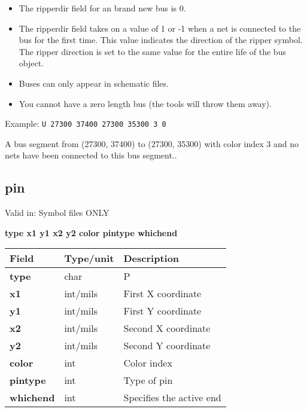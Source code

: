 \documentclass{article}
\begin{document}
\begin{itemize}
\item The ripperdir field for an brand new bus is 0.
\item The ripperdir field takes on a value of 1 or -1 when a net is connected
      to the bus for the first time.  This value indicates the direction of
      the ripper symbol.  The ripper direction is set to the same value for the
      entire life of the bus object. 
\item Buses can only appear in schematic files.
\item You cannot have a zero length bus (the tools will throw them away).
\end{itemize}

Example:\newline
{\tt U 27300 37400 27300 35300 3 0}

A bus segment from (27300, 37400) to (27300, 35300) with color index 3 and
no nets have been connected to this bus segment..


\subsection{pin}

Valid in: Symbol files ONLY

{\bf type x1 y1 x2 y2 color pintype whichend}

\begin{table}[h]
\begin{tabular}{|l|l|l|} \hline
Field 		& Type/unit 	& Description \\ \hline 
\hline
{\bf type} 	& char		& P \\ \hline
{\bf x1} 	& int/mils	& First X coordinate \\ \hline
{\bf y1} 	& int/mils	& First Y coordinate \\ \hline
{\bf x2} 	& int/mils	& Second X coordinate \\ \hline
{\bf y2} 	& int/mils	& Second Y coordinate \\ \hline
{\bf color} 	& int		& Color index \\ \hline
{\bf pintype} 	& int		& Type of pin \\ \hline
{\bf whichend} 	& int		& Specifies the active end \\ \hline
\end{tabular}
\end{table}
\end{document}
